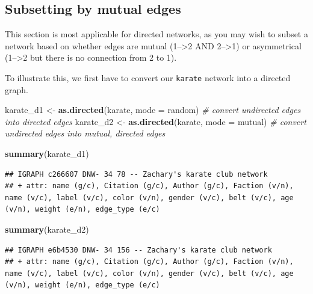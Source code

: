 \documentclass[
]{book}
\newenvironment{Shaded}{\begin{snugshade}}{\end{snugshade}}
\newcommand{\AttributeTok}[1]{\textcolor[rgb]{0.13,0.29,0.53}{#1}}
\newcommand{\CommentTok}[1]{\textcolor[rgb]{0.56,0.35,0.01}{\textit{#1}}}
\newcommand{\FunctionTok}[1]{\textcolor[rgb]{0.13,0.29,0.53}{\textbf{#1}}}
\newcommand{\NormalTok}[1]{#1}
\newcommand{\OtherTok}[1]{\textcolor[rgb]{0.56,0.35,0.01}{#1}}
\newcommand{\StringTok}[1]{\textcolor[rgb]{0.31,0.60,0.02}{#1}}
\begin{document}
\subsection{Subsetting by mutual edges}\label{subsetting-by-mutual-edges}

This section is most applicable for directed networks, as you may wish to subset a network based on whether edges are mutual (1--\textgreater2 AND 2--\textgreater1) or asymmetrical (1--\textgreater2 but there is no connection from 2 to 1).

To illustrate this, we first have to convert our \texttt{karate} network into a directed graph.

\begin{Shaded}
\begin{Highlighting}[]
\NormalTok{karate\_d1 }\OtherTok{\textless{}{-}} \FunctionTok{as.directed}\NormalTok{(karate, }\AttributeTok{mode =} \StringTok{\textquotesingle{}random\textquotesingle{}}\NormalTok{) }\CommentTok{\# convert undirected edges into directed edges }
\NormalTok{karate\_d2 }\OtherTok{\textless{}{-}} \FunctionTok{as.directed}\NormalTok{(karate, }\AttributeTok{mode =} \StringTok{\textquotesingle{}mutual\textquotesingle{}}\NormalTok{) }\CommentTok{\# convert undirected edges into mutual, directed edges}

\FunctionTok{summary}\NormalTok{(karate\_d1)}
\end{Highlighting}
\end{Shaded}

\begin{verbatim}
## IGRAPH c266607 DNW- 34 78 -- Zachary's karate club network
## + attr: name (g/c), Citation (g/c), Author (g/c), Faction (v/n), name (v/c), label (v/c), color (v/n), gender (v/c), belt (v/c), age (v/n), weight (e/n), edge_type (e/c)
\end{verbatim}

\begin{Shaded}
\begin{Highlighting}[]
\FunctionTok{summary}\NormalTok{(karate\_d2)}
\end{Highlighting}
\end{Shaded}

\begin{verbatim}
## IGRAPH e6b4530 DNW- 34 156 -- Zachary's karate club network
## + attr: name (g/c), Citation (g/c), Author (g/c), Faction (v/n), name (v/c), label (v/c), color (v/n), gender (v/c), belt (v/c), age (v/n), weight (e/n), edge_type (e/c)
\end{verbatim}
\end{document}
